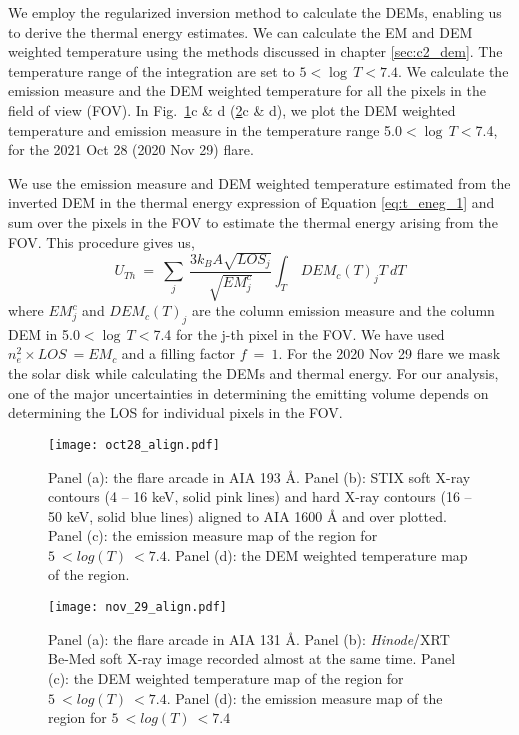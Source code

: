 We employ the regularized inversion method \citep{hannah&kontar12} to calculate the DEMs, enabling us to derive the thermal energy estimates. We can calculate the EM and DEM weighted temperature using the methods discussed in chapter \ref{sec:c2_dem}. The temperature range of the integration are set to $5 < \log\,T < 7.4$. We calculate the emission measure and the DEM weighted temperature for all the pixels in the field of view (FOV). In Fig.~\ref{fig:flare}c \& d (\ref{fig:flare2}c \& d), we plot the DEM weighted temperature and emission measure in the temperature range 5.0$<$$\log\,T$$<$7.4, for the 2021 Oct 28 (2020 Nov 29) flare.

We use the emission measure and DEM weighted temperature estimated from the inverted DEM in the thermal energy expression of Equation \ref{eq:t_eneg_1} and sum over the pixels in the FOV to estimate the thermal energy arising from the FOV. This procedure gives us,
\begin{equation}
    U_{Th}~=~\sum_{j}~\frac{3k_{B}A\sqrt{LOS_{j}}}{\sqrt{EM^{c}_{j}}}\int_{T}~DEM_{c}(T)_{j}T~dT
    \label{eq:t_eneg}
\end{equation}
where $EM^{c}_{j}$ and $DEM_{c}(T)_{j}$ are the column emission measure and the column DEM in 5.0$<$$\log\,T$$<$7.4 for the j-th pixel in the FOV. We have used $n_{e}^{2}\times LOS~=EM_{c}$ and a filling factor $\textit{f}~=~1$. For the 2020 Nov 29 flare we mask the solar disk while calculating the DEMs and thermal energy. For our analysis, one of the major uncertainties in determining the emitting volume depends on determining the LOS for individual pixels in the FOV.

\begin{figure}[ht!]
    \texttt{[image: oct28\_align.pdf]}
    \caption{Panel (a): the flare arcade in AIA 193 {\AA}. Panel (b): STIX soft X-ray contours (4 {--} 16 keV, solid pink lines) and hard X-ray contours (16 {--} 50 keV, solid blue lines) aligned to AIA 1600 {\AA} and over plotted. Panel (c): the emission measure map of the region for $5~<log(T)~<7.4$. Panel (d): the DEM weighted temperature map of the region.}
    \label{fig:flare}
\end{figure}

\begin{figure}[ht!]
\centering
    \texttt{[image: nov\_29\_align.pdf]}
    \caption{Panel (a): the flare arcade in AIA 131 {\AA}. Panel (b): {\it Hinode}/XRT Be-Med soft X-ray image recorded almost at the same time. Panel (c):  the DEM weighted temperature map of the region for $5~<log(T)~<7.4$. Panel (d): the emission measure map of the region for $5~<log(T)~<7.4$}
    \label{fig:flare2}
\end{figure}

